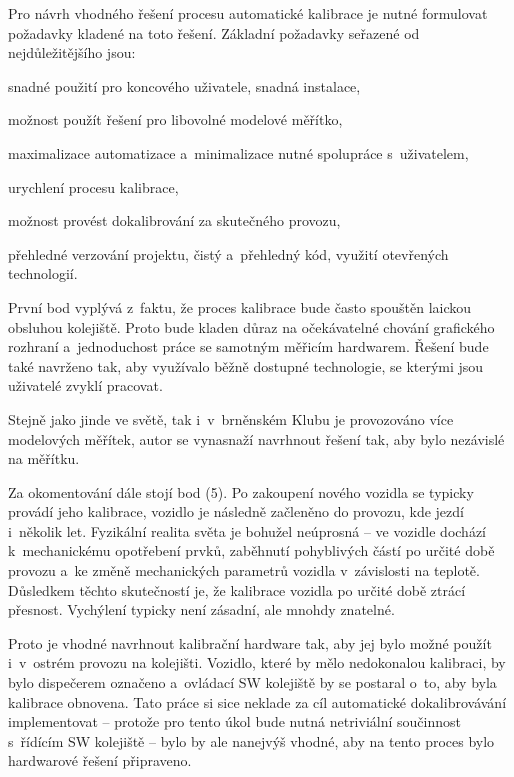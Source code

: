 Pro návrh vhodného řešení procesu automatické kalibrace je nutné formulovat
požadavky kladené na toto řešení. Základní požadavky seřazené od
nejdůležitějšího jsou:

\begin{compactenum}
	\item snadné použití pro koncového uživatele, snadná instalace,
	\item možnost použít řešení pro libovolné modelové měřítko,
	\item maximalizace automatizace a~minimalizace nutné spolupráce s~uživatelem,
	\item urychlení procesu kalibrace,
	\item možnost provést dokalibrování za skutečného provozu,
	\item přehledné verzování projektu, čistý a~přehledný kód, využití
	otevřených technologií.
\end{compactenum}

První bod vyplývá z~faktu, že proces kalibrace bude často spouštěn laickou
obsluhou kolejiště. Proto bude kladen důraz na očekávatelné chování grafického
rozhraní a~jednoduchost práce se samotným měřicím hardwarem. Řešení bude také
navrženo tak, aby využívalo běžně dostupné technologie, se kterými jsou
uživatelé zvyklí pracovat.

Stejně jako jinde ve světě, tak i~v~brněnském Klubu je provozováno více
modelových měřítek, autor se vynasnaží navrhnout řešení tak, aby bylo nezávislé
na měřítku.

Za okomentování dále stojí bod (5). Po zakoupení nového vozidla se typicky
provádí jeho kalibrace, vozidlo je následně začleněno do provozu, kde jezdí
i~několik let. Fyzikální realita světa je bohužel neúprosná -- ve vozidle
dochází k~mechanickému opotřebení prvků, zaběhnutí pohyblivých částí po určité
době provozu a~ke změně mechanických parametrů vozidla v~závislosti na teplotě.
Důsledkem těchto skutečností je, že kalibrace vozidla po určité době ztrácí
přesnost. Vychýlení typicky není zásadní, ale mnohdy znatelné.

Proto je vhodné navrhnout kalibrační hardware tak, aby jej bylo možné použít
i~v~ostrém provozu na kolejišti. Vozidlo, které by mělo nedokonalou kalibraci,
by bylo dispečerem označeno a~ovládací SW kolejiště by se postaral o~to, aby
byla kalibrace obnovena. Tato práce si sice neklade za cíl automatické
dokalibrovávání implementovat -- protože pro tento úkol bude nutná netriviální
součinnost s~řídícím SW kolejiště -- bylo by ale nanejvýš vhodné, aby na tento
proces bylo hardwarové řešení připraveno.
